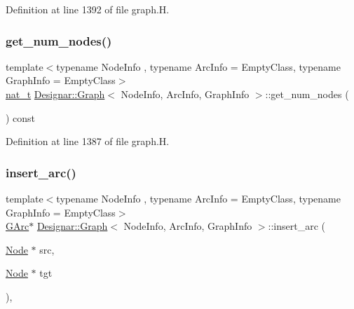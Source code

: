 Definition at line 1392 of file graph.\+H.

\mbox{\label{class_designar_1_1_graph_af6f0ef48386dd1353880ff706387c4e8}} 
\subsubsection{\texorpdfstring{get\+\_\+num\+\_\+nodes()}{get\_num\_nodes()}}
{\footnotesize\ttfamily template$<$typename Node\+Info , typename Arc\+Info  = Empty\+Class, typename Graph\+Info  = Empty\+Class$>$ \\
\hyperlink{namespace_designar_aa72662848b9f4815e7bf31a7cf3e33d1}{nat\+\_\+t} \hyperlink{class_designar_1_1_graph}{Designar\+::\+Graph}$<$ Node\+Info, Arc\+Info, Graph\+Info $>$\+::get\+\_\+num\+\_\+nodes (\begin{DoxyParamCaption}{ }\end{DoxyParamCaption}) const\hspace{0.3cm}{\ttfamily [inline]}}



Definition at line 1387 of file graph.\+H.

\mbox{\label{class_designar_1_1_graph_a20f183a1481fb62bc775aca6bd3244d1}} 
\subsubsection{\texorpdfstring{insert\+\_\+arc()}{insert\_arc()}\hspace{0.1cm}{\footnotesize\ttfamily [1/4]}}
{\footnotesize\ttfamily template$<$typename Node\+Info , typename Arc\+Info  = Empty\+Class, typename Graph\+Info  = Empty\+Class$>$ \\
\hyperlink{class_designar_1_1_graph_a5ad9e18b71899c2d4979426e367e5573}{G\+Arc}$\ast$ \hyperlink{class_designar_1_1_graph}{Designar\+::\+Graph}$<$ Node\+Info, Arc\+Info, Graph\+Info $>$\+::insert\+\_\+arc (\begin{DoxyParamCaption}\item[{\hyperlink{class_designar_1_1_graph_a5dfc7dba9d092ac489c72e40390c37d0}{Node} $\ast$}]{src,  }\item[{\hyperlink{class_designar_1_1_graph_a5dfc7dba9d092ac489c72e40390c37d0}{Node} $\ast$}]{tgt }\end{DoxyParamCaption})\hspace{0.3cm}{\ttfamily [inline]}, {\ttfamily [protected]}}



